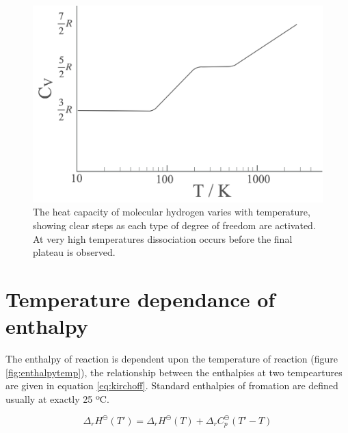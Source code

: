 \documentclass[
]{book}
\begin{document}
\begin{figure}

{\centering \includegraphics[width=0.7\linewidth]{images/H2heatcapacity} 

}

\caption{The heat capacity of molecular hydrogen varies with temperature, showing clear steps as each type of degree of freedom are activated. At very high temperatures dissociation occurs before the final plateau is observed.}\label{fig:H2heatcapacity}
\end{figure}

\hypertarget{temperature-dependance-of-enthalpy}{%
\section{Temperature dependance of enthalpy}\label{temperature-dependance-of-enthalpy}}

The enthalpy of reaction is dependent upon the temperature of reaction (figure \ref{fig:enthalpytemp}), the relationship between the enthalpies at two tempeartures are given in equation \eqref{eq:kirchoff}. Standard enthalpies of fromation are defined usually at exactly 25 ºC.

\begin{equation}
\Delta_r H^{\ominus} (T')=\Delta_r H^{\ominus} (T) + \Delta_r C_p^{\ominus} (T'-T)
\label{eq:kirchoff}
\end{equation}
\end{document}
